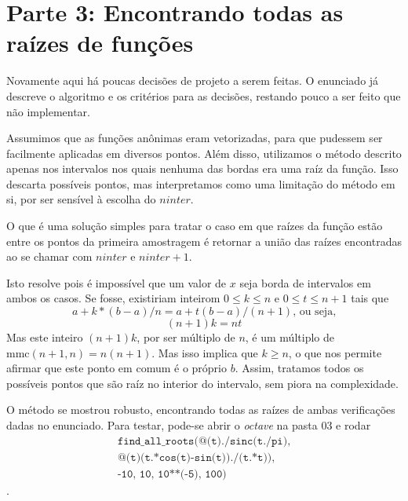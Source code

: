 \documentclass{article}
\begin{document}
\section{Parte 3: Encontrando todas as raízes de funções}
Novamente aqui há poucas decisões de projeto a serem feitas. O enunciado já descreve o algoritmo e os critérios para as decisões, restando pouco a ser feito que não implementar.  

Assumimos que as funções anônimas eram vetorizadas, para que pudessem ser facilmente aplicadas em diversos pontos. Além disso, utilizamos o método descrito apenas nos intervalos nos quais nenhuma das bordas era uma raíz da função. Isso descarta possíveis pontos, mas interpretamos como uma limitação do método em si, por ser sensível à escolha do $\textit{ninter}$.  

O que é uma solução simples para tratar o caso em que raízes da função estão entre os pontos da primeira amostragem é retornar a união das raízes encontradas ao se chamar com $\textit{ninter}$ e $\textit{ninter} + 1$.  

Isto resolve pois é impossível que um valor de $x$ seja borda de intervalos em ambos os casos. Se fosse, existiriam inteirom $0 \leq k \leq n$ e $0 \leq t \leq n+1$ tais que
$$ a + k*(b-a)/n = a + t(b-a)/(n+1) \text{, ou seja,}$$
$$(n+1)k = nt$$
Mas este inteiro $(n+1)k$, por ser múltiplo de $n$, é um múltiplo de $\mathrm{mmc}(n+1,n) = n(n+1)$. Mas isso implica que $k \geq n$, o que nos permite afirmar que este ponto em comum é o próprio $b$. Assim, tratamos todos os possíveis pontos que são raíz no interior do intervalo, sem piora na complexidade.  

O método se mostrou robusto, encontrando todas as raízes de ambas verificações dadas no enunciado. Para testar, pode-se abrir o \textit{octave} na pasta 03 e rodar 
\begin{equation*} \begin{split}
    \texttt{find\_all\_roots(@(t)./sinc(t./pi),} \\
    \texttt{@(t)(t.*cos(t)-sin(t))./(t.*t)),} \\
    \texttt{-10, 10, 10**(-5), 100)}
\end{split} \end{equation*}.
\end{document}
